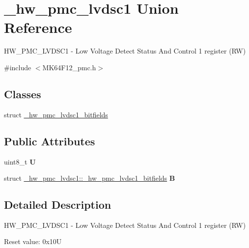 \hypertarget{union__hw__pmc__lvdsc1}{}\section{\+\_\+hw\+\_\+pmc\+\_\+lvdsc1 Union Reference}
\label{union__hw__pmc__lvdsc1}


H\+W\+\_\+\+P\+M\+C\+\_\+\+L\+V\+D\+S\+C1 -\/ Low Voltage Detect Status And Control 1 register (RW)  




{\ttfamily \#include $<$M\+K64\+F12\+\_\+pmc.\+h$>$}

\subsection*{Classes}
\begin{DoxyCompactItemize}
\item 
struct \hyperlink{struct__hw__pmc__lvdsc1_1_1__hw__pmc__lvdsc1__bitfields}{\+\_\+hw\+\_\+pmc\+\_\+lvdsc1\+\_\+bitfields}
\end{DoxyCompactItemize}
\subsection*{Public Attributes}
\begin{DoxyCompactItemize}
\item 
uint8\+\_\+t {\bfseries U}\hypertarget{union__hw__pmc__lvdsc1_aaa9b15ee8f5a9c3fdd1e7f0bf4d9bfad}{}\label{union__hw__pmc__lvdsc1_aaa9b15ee8f5a9c3fdd1e7f0bf4d9bfad}

\item 
struct \hyperlink{struct__hw__pmc__lvdsc1_1_1__hw__pmc__lvdsc1__bitfields}{\+\_\+hw\+\_\+pmc\+\_\+lvdsc1\+::\+\_\+hw\+\_\+pmc\+\_\+lvdsc1\+\_\+bitfields} {\bfseries B}\hypertarget{union__hw__pmc__lvdsc1_a9ef287bd76557ed14ea7d089ad47abba}{}\label{union__hw__pmc__lvdsc1_a9ef287bd76557ed14ea7d089ad47abba}

\end{DoxyCompactItemize}


\subsection{Detailed Description}
H\+W\+\_\+\+P\+M\+C\+\_\+\+L\+V\+D\+S\+C1 -\/ Low Voltage Detect Status And Control 1 register (RW) 

Reset value\+: 0x10U

